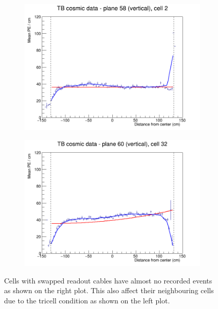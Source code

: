 \documentclass[12pt,a4paper]{article}
\begin{document}
\begin{figure}[h]
  \begin{subfigure}{0.5\textwidth}
    \includegraphics[width=\linewidth]{RelativeCalibrationResults/ep3abc_058_002.png}
  \end{subfigure}
  \begin{subfigure}{0.5\textwidth}
    \includegraphics[width=\linewidth]{RelativeCalibrationResults/ep3abc_060_032.png}
  \end{subfigure}
  \caption{Cells with swapped readout cables have almost no recorded events as shown on the right plot. This also affect their neighbouring cells due to the tricell condition as shown on the left plot.}
  \label{figAttenfitResultsEpoch3abc_CellEdges}
\end{figure}
\end{document}
